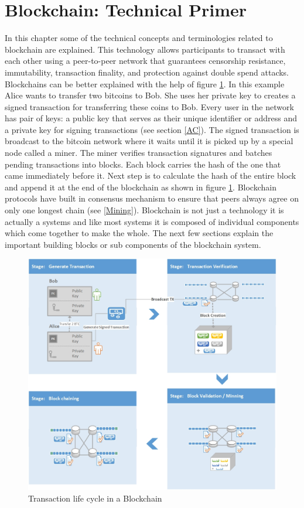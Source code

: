 \section{Blockchain: Technical Primer} \label{Blockchain}
In this chapter some of the technical concepts and terminologies related to blockchain are explained. This technology allows participants to transact with each other using a peer-to-peer network that guarantees censorship resistance, immutability, transaction finality, and protection against double spend attacks. Blockchains can be better explained with the help of figure \ref{fig:bc-workflow}. In this example Alice wants to transfer two bitcoins to Bob. She uses her private key to creates a signed transaction for transferring these coins to Bob. Every user in the network has pair of keys: a public key that serves as their unique identifier or address and a private key for signing transactions (see section \ref{AC}). The signed transaction is broadcast to the bitcoin network where it waits until it is picked up by a special node called a miner. The miner verifies transaction signatures and batches pending transactions into blocks. Each block carries the hash of the one that came immediately before it. Next step is to calculate the hash of the entire block and append it at the end of the blockchain as shown in figure \ref{fig:bc-workflow}. Blockchain protocols have built in consensus mechanism to ensure that peers always agree on only one longest chain (see \ref{Mining}). Blockchain is not just a technology it is actually a systems and like most systems it is composed of individual components which come together to make the whole. The next few sections explain the important building blocks or sub components of the blockchain system.
\vspace{0.5cm}
\begin{figure}[h]
	\centering
    \includegraphics[width=130mm,scale=1]{figs/bc-workflow}
	\caption{Transaction life cycle in a Blockchain}
	\label{fig:bc-workflow}
\end{figure}
\clearpage

